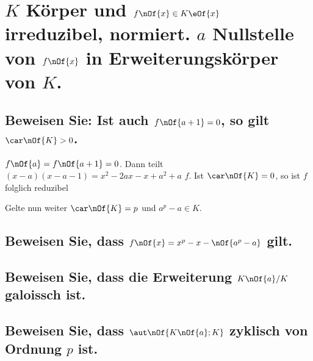 \section{$K$ Körper und $f\nOf{x}\in K \eOf{x}$ irreduzibel, normiert. $a$ Nullstelle von $f\nOf{x}$ in Erweiterungskörper von $K$.}

\subsection{Beweisen Sie: Ist auch $f\nOf{a + 1} = 0$, so gilt $\car\nOf{K} > 0$.}
$f\nOf{a} = f\nOf{a+1} = 0$. Dann teilt $(x-a)(x-a-1) = x^2-2ax-x+a^2+a$ $f$. Ist $\car\nOf{K} = 0$, so ist $f$ folglich reduzibel

Gelte nun weiter $\car\nOf{K} = p$ und $a^p - a \in K$.
\subsection{Beweisen Sie, dass $f\nOf{x} = x^p - x - \nOf{a^p - a}$ gilt.}

\subsection{Beweisen Sie, dass die Erweiterung $K\nOf{a}/K$ galoissch ist.}

\subsection{Beweisen Sie, dass $\aut\nOf{K\nOf{a};K}$ zyklisch von Ordnung $p$ ist.}
